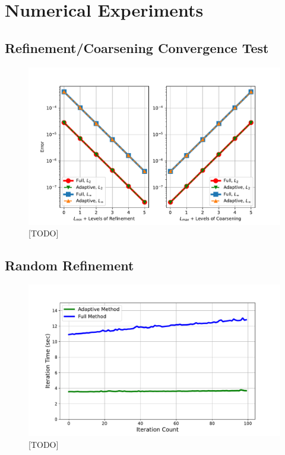 \section{Numerical Experiments}

\subsection{Refinement/Coarsening Convergence Test}

\begin{figure}
    \centering
    \includegraphics[width=\textwidth, clip=true, trim={40 0 40 40}]{figures/full-vs-adaptive-convergence-no-title.pdf}
    \caption{[TODO]}
    \label{fig:full-vs-adaptive-convergence}
\end{figure}

\subsection{Random Refinement}

\begin{figure}
    \centering
    \includegraphics[width=\textwidth, clip=true, trim={40 0 40 40}]{figures/full-vs-adaptive-time-comparison-no-title.pdf}
    \caption{[TODO]}
    \label{fig:full-vs-adaptive-time-comparison}
\end{figure}